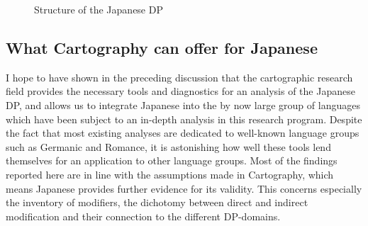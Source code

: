 \begin{figure}
\small
 \begin{subfigure}{0.5\textwidth}

 \end{subfigure}%
 \begin{subfigure}{0.5\textwidth}
 \end{subfigure}
 \caption{Structure of the Japanese DP}
 \label{fig:Structure of the Japanese DP3}
\end{figure}

\subsection{What Cartography can offer for Japanese}

I hope to have shown in the preceding discussion that the cartographic research field provides the necessary tools and diagnostics for an analysis of the Japanese DP, and allows us to integrate Japanese into the by now large group of languages which have been subject to an in-depth analysis in this research program. Despite the fact that most existing analyses are dedicated to well-known language groups such as Germanic and Romance, it is astonishing how well these tools lend themselves for an application to other language groups. Most of the findings reported here are in line with the assumptions made in Cartography, which means Japanese provides further evidence for its validity. This concerns especially the inventory of modifiers, the dichotomy between direct and indirect modification and their connection to the different DP-domains.

